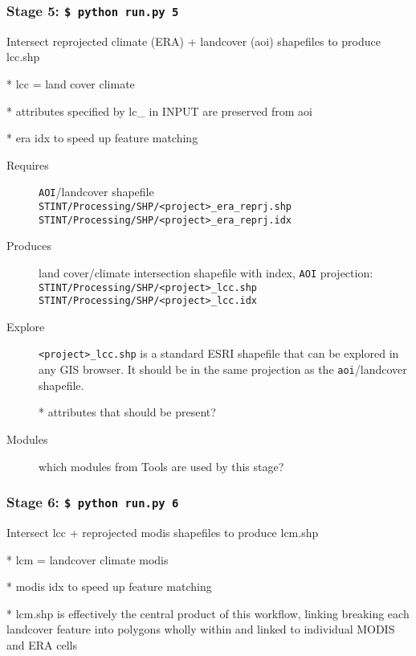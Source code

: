 \documentclass[twoside,a4paper]{refart}
\begin{document}
\subsubsection{\textbf{Stage 5:} \texttt{\$ python run.py 5}}
        Intersect reprojected climate (ERA) + landcover (aoi) shapefiles
        to produce lcc.shp
        
          * lcc = land cover climate
          
          * attributes specified by lc\_ in INPUT are preserved from aoi
          
          * era idx to speed up feature matching

  \begin{description}
    \item [Requires]
      \texttt{AOI}/landcover shapefile\\
      \texttt{STINT/Processing/SHP/<project>\_era\_reprj.shp}\\
      \texttt{STINT/Processing/SHP/<project>\_era\_reprj.idx}  
  
  
    \item [Produces]
      land cover/climate intersection shapefile with index, 
      \texttt{AOI} projection:\\
      \texttt{STINT/Processing/SHP/<project>\_lcc.shp}\\
      \texttt{STINT/Processing/SHP/<project>\_lcc.idx}

    \item [Explore]
      \texttt{<project>\_lcc.shp} is a standard ESRI shapefile that can be explored in any GIS browser.  It should be in the same projection as the \texttt{aoi}/landcover shapefile.
      
      * attributes that should be present?

    \item [Modules]
      which modules from Tools are used by this stage?
  \end{description}


\subsubsection{\textbf{Stage 6:} \texttt{\$ python run.py 6}}
        Intersect lcc + reprojected modis shapefiles to produce lcm.shp
        
        * lcm = landcover climate modis
        
        * modis idx to speed up feature matching
        
        * lcm.shp is effectively the central product of this workflow, linking
          breaking each landcover feature into polygons wholly within and
          linked to individual MODIS and ERA cells
\end{document}
